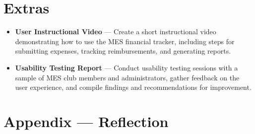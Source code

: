 \documentclass{article}
\begin{document}
\section{Extras}

\begin{itemize}
\item \textbf{User Instructional Video} — Create a short instructional video demonstrating how to use the MES financial tracker, including steps for submitting expenses, tracking reimbursements, and generating reports.
\item \textbf{Usability Testing Report} — Conduct usability testing sessions with a sample of MES club members and administrators, gather feedback on the user experience, and compile findings and recommendations for improvement.
\end{itemize}

\newpage{}

\section*{Appendix --- Reflection}


\end{document}
